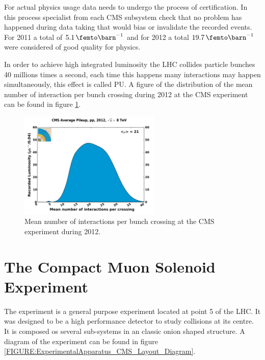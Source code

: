 For actual physics usage data needs to undergo the process of certification. In this process specialist from each \gls{CMS} subsystem check that no problem has happened during data taking that would bias or invalidate the recorded events. For 2011 a total of $5.1\,\femto\barn^{-1}$ and for 2012 a total $19.7\,\femto\barn^{-1}$ were considered of good quality for physics. 

In order to achieve high integrated luminosity the \gls{LHC} collides particle bunches 40 millions times a second, each time this happens many interactions may happen simultaneously, this effect is called \gls{PU}. A figure of the distribution of the mean number of interaction per bunch crossing during 2012 at the CMS experiment can be found in figure \ref{FIGURE:ExperimentalApparatus_CMS_PileIp_pp_2012}.

\begin{figure}[!htb]
  \centering
  \includegraphics[width=0.60\textwidth]{Chapter02/CMS/Images/CMS_PileIp_pp_2012}
  \caption{Mean number of interactions per bunch crossing at the CMS experiment during 2012.}
  \label{FIGURE:ExperimentalApparatus_CMS_PileIp_pp_2012}
\end{figure}

\section{The Compact Muon Solenoid Experiment}
\label{SECTION:ExperimentalApparatus_CMS}


The  experiment is a general purpose experiment located at point 5 of the \gls{LHC}. It was designed to be a high performance detector to study collisions at its centre. It is composed os several sub-systems in an classic onion shaped structure. A diagram of the experiment can be found in figure \ref{FIGURE:ExperimentalApparatus_CMS_Layout_Diagram}.

